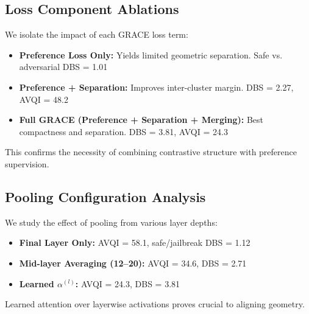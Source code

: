 \begin{table}[h]
\centering
{}
\caption{ASR breakdown (\%) across adversarial attack categories for Vicuna-1.5 before and after GRACE.}
\label{tab:asr_breakdown}
\end{table}


\subsection{Loss Component Ablations}
We isolate the impact of each GRACE loss term:
\begin{itemize}
    \item \textbf{Preference Loss Only:} Yields limited geometric separation. Safe vs. adversarial DBS = 1.01
    \item \textbf{Preference + Separation:} Improves inter-cluster margin. DBS = 2.27, AVQI = 48.2
    \item \textbf{Full GRACE (Preference + Separation + Merging):} Best compactness and separation. DBS = 3.81, AVQI = 24.3
\end{itemize}
This confirms the necessity of combining contrastive structure with preference supervision.

\subsection{Pooling Configuration Analysis}
We study the effect of pooling from various layer depths:
\begin{itemize}
    \item \textbf{Final Layer Only:} AVQI = 58.1, safe/jailbreak DBS = 1.12
    \item \textbf{Mid-layer Averaging (12--20):} AVQI = 34.6, DBS = 2.71
    \item \textbf{Learned \(\alpha^{(l)}\):} AVQI = 24.3, DBS = 3.81
\end{itemize}
Learned attention over layerwise activations proves crucial to aligning geometry.

